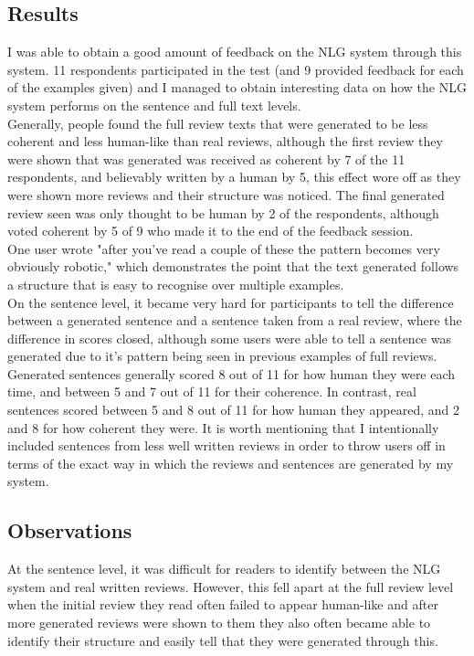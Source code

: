 \subsection{Results}
I was able to obtain a good amount of feedback on the NLG system through this system. 11 respondents participated in the test (and 9 provided feedback for each of the examples given) and I managed to obtain interesting data on how the NLG system performs on the sentence and full text levels.\\
Generally, people found the full review texts that were generated to be less coherent and less human-like than real reviews, although the first review they were shown that was generated was received as coherent by 7 of the 11 respondents, and believably written by a human by 5, this effect wore off as they were shown more reviews and their structure was noticed. The final generated review seen was only thought to be human by 2 of the respondents, although voted coherent by 5 of 9 who made it to the end of the feedback session. \\

One user wrote "after you've read a couple of these the pattern becomes very obviously robotic," which demonstrates the point that the text generated follows a structure that is easy to recognise over multiple examples.\\

On the sentence level, it became very hard for participants to tell the difference between a generated sentence and a sentence taken from a real review, where the difference in scores closed, although some users were able to tell a sentence was generated due to it's pattern being seen in previous examples of full reviews. Generated sentences generally scored 8 out of 11 for how human they were each time, and between 5 and 7 out of 11 for their coherence. In contrast, real sentences scored between 5 and 8 out of 11 for how human they appeared, and 2 and 8 for how coherent they were. It is worth mentioning that I intentionally included sentences from less well written reviews in order to throw users off in terms of the exact way in which the reviews and sentences are generated by my system.\\



\subsection{Observations}
At the sentence level, it was difficult for readers to identify between the NLG system and real written reviews. However, this fell apart at the full review level when the initial review they read often failed to appear human-like and after more generated reviews were shown to them they also often became able to identify their structure and easily tell that they were generated through this.\\

